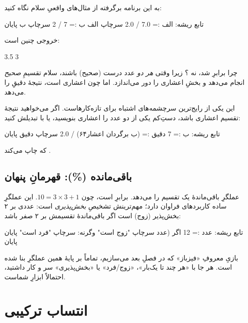 به این برنامه برگرفته از مثال‌های واقعیِ سلام نگاه کنید:

\begin{salamfa}
تابع ریشه:
    الف := 7.0 / 2.0
    سرچاپ الف
    ب := 7 / 2
    سرچاپ ب
پایان
\end{salamfa}

خروجی چنین است:

\begin{salamen}[language={}]
3.5
3
\end{salamen}

چرا  برابرِ  شد، نه ؟ زیرا وقتی \emph{هر دو} عدد
درست (صحیح) باشند، سلام تقسیمِ \emph{صحیح} انجام می‌دهد و بخشِ اعشاری را دور
می‌اندازد. اما  چون اعشاری است، نتیجهٔ دقیقِ  را
می‌دهد.

\begin{warn}
این یکی از رایج‌ترین سرچشمه‌های اشتباه برای تازه‌کارهاست. اگر می‌خواهید نتیجهٔ
تقسیم اعشاری باشد، دستِ‌کم یکی از دو عدد را اعشاری بنویسید، یا با
 تبدیلش کنید:
\begin{salamfa}
تابع ریشه:
    ب := 7
    دقیق := (ب برگردان اعشار۶۴) / 2.0
    سرچاپ دقیق
پایان
\end{salamfa}
که چاپ می‌کند .
\end{warn}

\subsection{باقی‌مانده (\%): قهرمانِ پنهان}

عملگرِ \code{\%} باقی‌ماندهٔ یک تقسیم را می‌دهد.  برابرِ 
است، چون $10 = 3\times 3 + 1$. این عملگرِ ساده کاربردهای فراوان دارد؛
مهم‌ترینش تشخیصِ \emph{بخش‌پذیری} است: عددی بر ۲ بخش‌پذیر (زوج) است اگر
باقی‌ماندهٔ تقسیمش بر ۲ صفر باشد:

\begin{salamfa}
تابع ریشه:
    عدد := 12
    اگر (عدد %
        سرچاپ "زوج است"
    وگرنه:
        سرچاپ "فرد است"
    پایان
پایان
\end{salamfa}

\begin{tip}
بازیِ معروفِ «فیزباز» که در فصلِ بعد می‌سازیم، تماماً بر پایهٔ همین عملگرِ
\code{\%} بنا شده است. هر جا با «هر چند تا یک‌بار»، «زوج/فرد» یا «بخش‌پذیری»
سر و کار داشتید، احتمالاً \code{\%} ابزارِ شماست.
\end{tip}

\section{انتساب ترکیبی}

